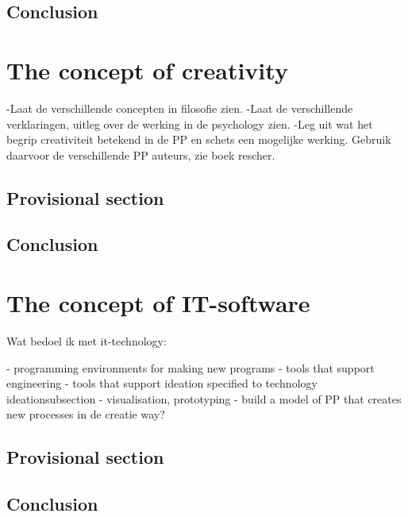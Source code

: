 \documentclass[a4paper]{Thesis}
\begin{document}
\section{Conclusion}

\chapter{The concept of creativity}



-Laat de verschillende concepten in filosofie zien.
-Laat de verschillende verklaringen, uitleg over de werking in de psychology zien.
-Leg uit wat het begrip creativiteit betekend in de PP en schets een mogelijke werking. Gebruik daarvoor de verschillende PP auteurs, zie boek rescher.

\section{Provisional section}

\section{Conclusion}

\chapter{The concept of IT-software}
Wat bedoel ik met it-technology:

- programming environments for making new programs
- tools that support engineering
- tools that support ideation specified to technology ideationsubsection{}
- visualisation, prototyping
- build a model of PP that creates new processes in de creatie way?

\section{Provisional section}
\section{Conclusion}

\end{document}
